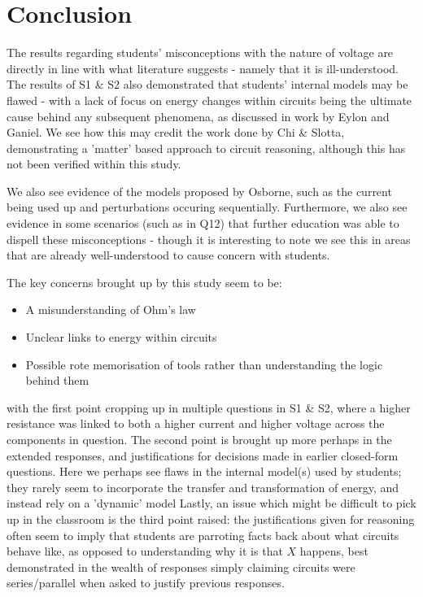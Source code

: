 \documentclass[a4paper,openany,nobib]{tufte-book}
\begin{document}
\chapter{Conclusion}%

The results regarding students' misconceptions with the nature of voltage are directly in line with what literature suggests - namely that it is ill-understood. The results of S1 \& S2 also demonstrated that students' internal models may be flawed - with a lack of focus on energy changes within circuits being the ultimate cause behind any subsequent phenomena, as discussed in work by Eylon and Ganiel. We see how this may credit the work done by Chi \& Slotta, demonstrating a 'matter' based approach to circuit reasoning, although this has not been verified within this study.

We also see evidence of the models proposed by Osborne, such as the current being used up and perturbations occuring sequentially. Furthermore, we also see evidence in some scenarios (such as in Q12) that further education was able to dispell these misconceptions - though it is interesting to note we see this in areas that are already well-understood to cause concern with students.

The key concerns brought up by this study seem to be:
\begin{itemize}
	\item A misunderstanding of Ohm's law
	\item Unclear links to energy within circuits
	\item Possible rote memorisation of tools rather than understanding the logic behind them
\end{itemize}
with the first point cropping up in multiple questions in S1 \& S2, where a higher resistance was linked to both a higher current and higher voltage across the components in question. The second point is brought up more perhaps in the extended responses, and justifications for decisions made in earlier closed-form questions. Here we perhaps see flaws in the internal model(s) used by students; they rarely seem to incorporate the transfer and transformation of energy, and instead rely on a 'dynamic' model
Lastly, an issue which might be difficult to pick up in the classroom is the third point raised: the justifications given for reasoning often seem to imply that students are parroting facts back about what circuits behave like, as opposed to understanding why it is that $X$ happens, best demonstrated in the wealth of responses simply claiming circuits were series/parallel when asked to justify previous responses.
\end{document}
